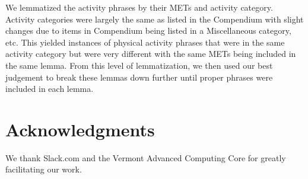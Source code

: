 \documentclass[10pt]{article}
\begin{document}
We lemmatized the activity phrases by their METs and activity
category.  Activity categories were largely the same as listed in the
Compendium with slight changes due to items in Compendium being listed
in a Miscellaneous category, etc. This yielded instances of physical
activity phrases that were in the same activity category but were very
different with the same METs being included in the same lemma.  From
this level of lemmatization, we then used our best judgement to break
these lemmas down further until proper phrases were included in each
lemma.

\section*{Acknowledgments}

We thank Slack.com
and the Vermont Advanced Computing Core for 
greatly facilitating our work.
\end{document}
